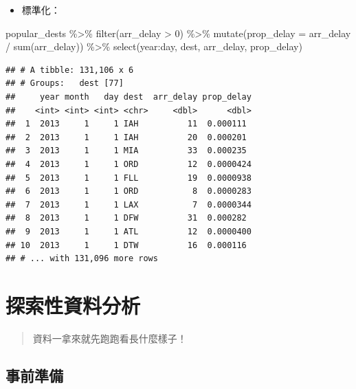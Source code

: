 \documentclass[
]{book}
\newenvironment{Shaded}{\begin{snugshade}}{\end{snugshade}}
\newcommand{\AttributeTok}[1]{\textcolor[rgb]{0.77,0.63,0.00}{#1}}
\newcommand{\DecValTok}[1]{\textcolor[rgb]{0.00,0.00,0.81}{#1}}
\newcommand{\FunctionTok}[1]{\textcolor[rgb]{0.00,0.00,0.00}{#1}}
\newcommand{\NormalTok}[1]{#1}
\newcommand{\SpecialCharTok}[1]{\textcolor[rgb]{0.00,0.00,0.00}{#1}}
\providecommand{\tightlist}{%
  \setlength{\itemsep}{0pt}\setlength{\parskip}{0pt}}
\theoremstyle{definition}
\theoremstyle{remark}
\begin{document}
\begin{itemize}
\tightlist
\item
  標準化：
\end{itemize}

\begin{Shaded}
\begin{Highlighting}[]
\NormalTok{popular\_dests }\SpecialCharTok{\%\textgreater{}\%}
  \FunctionTok{filter}\NormalTok{(arr\_delay }\SpecialCharTok{\textgreater{}} \DecValTok{0}\NormalTok{) }\SpecialCharTok{\%\textgreater{}\%}
  \FunctionTok{mutate}\NormalTok{(}\AttributeTok{prop\_delay =}\NormalTok{ arr\_delay }\SpecialCharTok{/} \FunctionTok{sum}\NormalTok{(arr\_delay)) }\SpecialCharTok{\%\textgreater{}\%}
  \FunctionTok{select}\NormalTok{(year}\SpecialCharTok{:}\NormalTok{day, dest, arr\_delay, prop\_delay)}
\end{Highlighting}
\end{Shaded}

\begin{verbatim}
## # A tibble: 131,106 x 6
## # Groups:   dest [77]
##     year month   day dest  arr_delay prop_delay
##    <int> <int> <int> <chr>     <dbl>      <dbl>
##  1  2013     1     1 IAH          11  0.000111 
##  2  2013     1     1 IAH          20  0.000201 
##  3  2013     1     1 MIA          33  0.000235 
##  4  2013     1     1 ORD          12  0.0000424
##  5  2013     1     1 FLL          19  0.0000938
##  6  2013     1     1 ORD           8  0.0000283
##  7  2013     1     1 LAX           7  0.0000344
##  8  2013     1     1 DFW          31  0.000282 
##  9  2013     1     1 ATL          12  0.0000400
## 10  2013     1     1 DTW          16  0.000116 
## # ... with 131,096 more rows
\end{verbatim}

\hypertarget{ux63a2ux7d22ux6027ux8cc7ux6599ux5206ux6790}{%
\chapter{探索性資料分析}\label{ux63a2ux7d22ux6027ux8cc7ux6599ux5206ux6790}}

\begin{quote}
資料一拿來就先跑跑看長什麼樣子！
\end{quote}

\hypertarget{ux4e8bux524dux6e96ux5099}{%
\section{事前準備}\label{ux4e8bux524dux6e96ux5099}}
\end{document}
